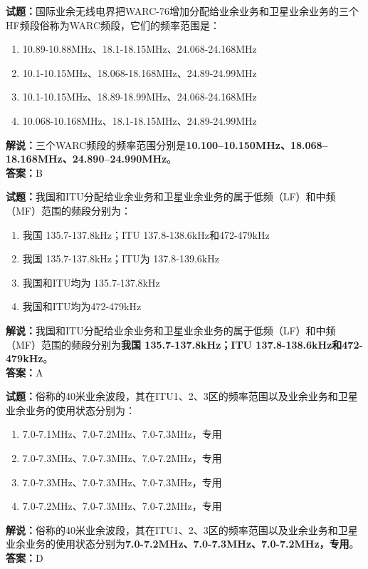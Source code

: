 \documentclass{ctexbook}
\begin{document}
\noindent\textbf{试题：}国际业余无线电界把WARC-76增加分配给业余业务和卫星业余业务的三个HF频段俗称为WARC频段，它们的频率范围是：
\begin{enumerate}[leftmargin=3em]
\item 10.89-10.88\unit{\MHz}、18.1-18.15\unit{\MHz}、24.068-24.168\unit{\MHz}
\item 10.1-10.15\unit{\MHz}、18.068-18.168\unit{\MHz}、24.89-24.99\unit{\MHz}
\item 10.1-10.15\unit{\MHz}、18.89-18.99\unit{\MHz}、24.068-24.168\unit{\MHz}
\item 10.068-10.168\unit{\MHz}、18.1-18.15\unit{\MHz}、24.89-24.99\unit{\MHz}
\end{enumerate}
\noindent\textbf{解说：}三个WARC频段的频率范围分别是\textbf{10.100–10.150\unit{\MHz}、18.068–18.168\unit{\MHz}、24.890–24.990\unit{\MHz}}。\\\noindent\textbf{答案：}B

\bigskip




\noindent\textbf{试题：}我国和ITU分配给业余业务和卫星业余业务的属于低频（LF）和中频（MF）范围的频段分别为：
\begin{enumerate}[leftmargin=3em]
\item 我国 135.7-137.8\unit{\kHz}；ITU 137.8-138.6\unit{\kHz}和472-479\unit{\kHz}
\item 我国 135.7-137.8\unit{\kHz}；ITU为 137.8-139.6\unit{\kHz}
\item 我国和ITU均为 135.7-137.8\unit{\kHz}
\item 我国和ITU均为472-479\unit{\kHz}
\end{enumerate}
\noindent\textbf{解说：}我国和ITU分配给业余业务和卫星业余业务的属于低频（LF）和中频（MF）范围的频段分别为\textbf{我国 135.7-137.8\unit{\kHz}；ITU 137.8-138.6\unit{\kHz}和472-479\unit{\kHz}}。\\\noindent\textbf{答案：}A

\bigskip




\noindent\textbf{试题：}俗称的40米业余波段，其在ITU1、2、3区的频率范围以及业余业务和卫星业余业务的使用状态分别为：
\begin{enumerate}[leftmargin=3em]
\item 7.0-7.1\unit{\MHz}、7.0-7.2\unit{\MHz}、7.0-7.3\unit{\MHz}，专用
\item 7.0-7.3\unit{\MHz}、7.0-7.3\unit{\MHz}、7.0-7.2\unit{\MHz}，专用
\item 7.0-7.3\unit{\MHz}、7.0-7.3\unit{\MHz}、7.0-7.3\unit{\MHz}，专用
\item 7.0-7.2\unit{\MHz}、7.0-7.3\unit{\MHz}、7.0-7.2\unit{\MHz}，专用
\end{enumerate}
\noindent\textbf{解说：}俗称的40米业余波段，其在ITU1、2、3区的频率范围以及业余业务和卫星业余业务的使用状态分别为\textbf{7.0-7.2\unit{\MHz}、7.0-7.3\unit{\MHz}、7.0-7.2\unit{\MHz}，专用}。\\\noindent\textbf{答案：}D
\end{document}
